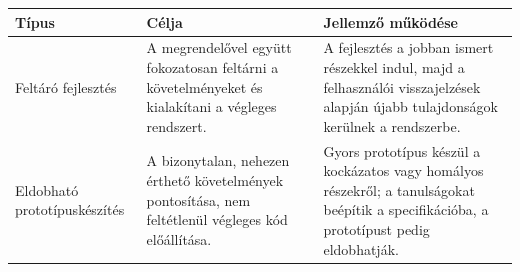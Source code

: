 \begin{tabularx}{\textwidth}{L{33mm}X X}
\toprule
\textbf{Típus} & \textbf{Célja} & \textbf{Jellemző működése} \\
\midrule
Feltáró fejlesztés & A megrendelővel együtt fokozatosan feltárni a követelményeket és kialakítani a végleges rendszert. & A fejlesztés a jobban ismert részekkel indul, majd a felhasználói visszajelzések alapján újabb tulajdonságok kerülnek a rendszerbe. \\
Eldobható prototípuskészítés & A bizonytalan, nehezen érthető követelmények pontosítása, nem feltétlenül végleges kód előállítása. & Gyors prototípus készül a kockázatos vagy homályos részekről; a tanulságokat beépítik a specifikációba, a prototípust pedig eldobhatják. \\
\bottomrule
\end{tabularx}
